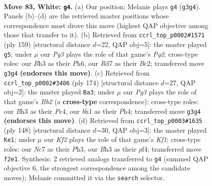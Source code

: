 \documentclass[11pt]{article}
\begin{document}
\clearpage

\begin{figure}[p]\centering
\begin{subfigure}{0.46\textwidth}\centering
\resizebox{\linewidth}{!}{%
\newchessgame
\chessboard[
  setfen={8/P1NR4/7k/5P2/np6/6PB/5K1P/7b w - - 3 83},
  showmover=false,
  pgfstyle=straightmove, color=movearrow, markmove={g3-g4}
]}
\caption{}
\end{subfigure}\hfill
\begin{subfigure}{0.46\textwidth}\centering
\resizebox{\linewidth}{!}{%
\newchessgame
\chessboard[
  setfen={8/5kp1/7p/1N6/1B5P/1n2K1P1/2b5/8 b - - 7 80},
  showmover=false,
  pgfstyle=straightmove, color=movearrow, markmove={g7-g5}
]}
\caption{}
\end{subfigure}
\\[4pt]
\begin{subfigure}{0.46\textwidth}\centering
\resizebox{\linewidth}{!}{%
\newchessgame
\chessboard[
  setfen={8/8/2b1k1p1/2P5/p1P4P/2K3P1/1B6/8 w - - 1 88},
  showmover=false,
  pgfstyle=straightmove, color=movearrow, markmove={b2-a3}
]}
\caption{}
\end{subfigure}\hfill
\begin{subfigure}{0.46\textwidth}\centering
\resizebox{\linewidth}{!}{%
\newchessgame
\chessboard[
  setfen={8/8/1b6/1P6/5pBp/3k3P/6P1/5K2 w - - 24 75},
  showmover=false,
  pgfstyle=straightmove, color=movearrow, markmove={f1-e1}
]}
\caption{}
\end{subfigure}
\caption{\textbf{Move 83, White: \texttt{g4}.} (a) Our position; Melanie plays \texttt{g4} (\texttt{g3g4}). Panels (b)--(d) are the retrieved master positions whose correspondence most drove this move (highest QAP objective among those that transfer to it). (b) Retrieved from \texttt{ccrl\_top\_p0002\#1571} (ply 159) [structural distance $d$=22, QAP obj=5]: the master played \texttt{g5}; under $\mu$ our \emph{Pg3} plays the role of that game's \emph{Pg2}; cross-type roles: our \emph{B}h3 as their \emph{P}h6, our \emph{R}d7 as their \emph{B}c2; transferred move \texttt{g3g4} \textbf{(endorses this move)}. (c) Retrieved from \texttt{ccrl\_top\_p0002\#3406} (ply 174) [structural distance $d$=27, QAP obj=2]: the master played \texttt{Ba3}; under $\mu$ our \emph{Pg3} plays the role of that game's \emph{Bb2} (a \textbf{cross-type} correspondence); cross-type roles: our \emph{B}h3 as their \emph{P}c4, our \emph{b}h1 as their \emph{P}h4; transferred move \texttt{g3g4} \textbf{(endorses this move)}. (d) Retrieved from \texttt{ccrl\_top\_p0003\#1635} (ply 148) [structural distance $d$=30, QAP obj=3]: the master played \texttt{Ke1}; under $\mu$ our \emph{Kf2} plays the role of that game's \emph{Kf1}; cross-type roles: our \emph{N}c7 as their \emph{P}h3, our \emph{B}h3 as their \emph{p}f4; transferred move \texttt{f2e1}. Synthesis: 2 retrieved analogs transferred to \texttt{g4} (summed QAP objective 6, the strongest correspondence among the candidate moves); Melanie committed it via the \texttt{search} selector.}
\label{fig:thought-m164}
\end{figure}
\end{document}
